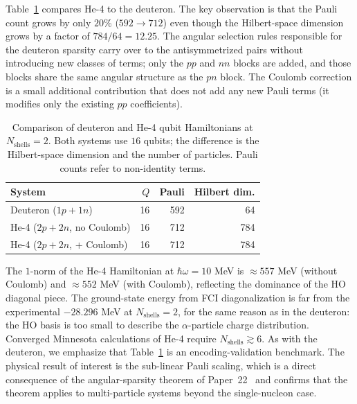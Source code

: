 \documentclass[twocolumn,prc,amsmath,amssymb,superscriptaddress]{revtex4-2}
\begin{document}
Table~\ref{tab:he4} compares He-4 to the deuteron. The key observation
is that the Pauli count grows by only $20\%$ ($592 \rightarrow 712$)
even though the Hilbert-space dimension grows by a factor of
$784/64 = 12.25$. The angular selection rules responsible for the
deuteron sparsity carry over to the antisymmetrized pairs without
introducing new classes of terms; only the $pp$ and $nn$ blocks are
added, and those blocks share the same angular structure as the $pn$
block. The Coulomb correction is a small additional contribution that
does not add any new Pauli terms (it modifies only the existing $pp$
coefficients).

\begin{table}[t]
  \centering
  \caption{Comparison of deuteron and He-4 qubit Hamiltonians at
    $N_{\mathrm{shells}}=2$. Both systems use $16$ qubits; the
    difference is the Hilbert-space dimension and the number of
    particles. Pauli counts refer to non-identity terms.}
  \label{tab:he4}
  \begin{ruledtabular}
  \begin{tabular}{lrrr}
    System & $Q$ & Pauli & Hilbert dim. \\
    \hline
    Deuteron ($1p+1n$)       & 16 & 592 & 64 \\
    He-4 ($2p+2n$, no Coulomb) & 16 & 712 & 784 \\
    He-4 ($2p+2n$, + Coulomb)  & 16 & 712 & 784 \\
  \end{tabular}
  \end{ruledtabular}
\end{table}

The $1$-norm of the He-4 Hamiltonian at $\hbar\omega = 10$ MeV is
$\approx 557$ MeV (without Coulomb) and $\approx 552$ MeV (with
Coulomb), reflecting the dominance of the HO diagonal piece. The
ground-state energy from FCI diagonalization is far from the
experimental $-28.296$ MeV at $N_{\mathrm{shells}}=2$, for the same
reason as in the deuteron: the HO basis is too small to describe the
$\alpha$-particle charge distribution. Converged Minnesota
calculations of He-4 require $N_{\mathrm{shells}} \gtrsim 6$. As with
the deuteron, we emphasize that Table~\ref{tab:he4} is an
encoding-validation benchmark. The physical result of interest is the
sub-linear Pauli scaling, which is a direct consequence of the
angular-sparsity theorem of Paper~22~\cite{Paper22} and confirms that
the theorem applies to multi-particle systems beyond the single-nucleon
case.
\end{document}
